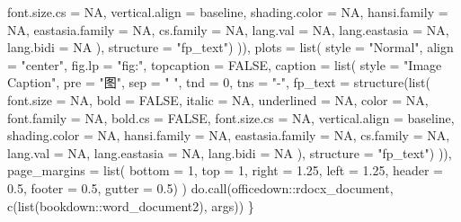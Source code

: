 \documentclass[
]{article}
\newenvironment{Shaded}{\begin{snugshade}}{\end{snugshade}}
\newcommand{\AttributeTok}[1]{\textcolor[rgb]{0.77,0.63,0.00}{#1}}
\newcommand{\ConstantTok}[1]{\textcolor[rgb]{0.00,0.00,0.00}{#1}}
\newcommand{\DecValTok}[1]{\textcolor[rgb]{0.00,0.00,0.81}{#1}}
\newcommand{\FloatTok}[1]{\textcolor[rgb]{0.00,0.00,0.81}{#1}}
\newcommand{\FunctionTok}[1]{\textcolor[rgb]{0.00,0.00,0.00}{#1}}
\newcommand{\NormalTok}[1]{#1}
\newcommand{\SpecialCharTok}[1]{\textcolor[rgb]{0.00,0.00,0.00}{#1}}
\newcommand{\StringTok}[1]{\textcolor[rgb]{0.31,0.60,0.02}{#1}}
\begin{document}
\begin{Shaded}
\begin{Highlighting}[]
          \AttributeTok{font.size.cs =} \ConstantTok{NA}\NormalTok{, }\AttributeTok{vertical.align =} \StringTok{\textquotesingle{}baseline\textquotesingle{}}\NormalTok{, }\AttributeTok{shading.color =} \ConstantTok{NA}\NormalTok{,}
          \AttributeTok{hansi.family =} \ConstantTok{NA}\NormalTok{, }\AttributeTok{eastasia.family =} \ConstantTok{NA}\NormalTok{, }\AttributeTok{cs.family =} \ConstantTok{NA}\NormalTok{,}
          \AttributeTok{lang.val =} \ConstantTok{NA}\NormalTok{, }\AttributeTok{lang.eastasia =} \ConstantTok{NA}\NormalTok{, }\AttributeTok{lang.bidi =} \ConstantTok{NA}
\NormalTok{        ), }\AttributeTok{structure =} \StringTok{"fp\_text"}\NormalTok{)}
\NormalTok{      )),}
    \AttributeTok{plots =} \FunctionTok{list}\NormalTok{(}
      \AttributeTok{style =} \StringTok{"Normal"}\NormalTok{, }\AttributeTok{align =} \StringTok{"center"}\NormalTok{, }\AttributeTok{fig.lp =} \StringTok{"fig:"}\NormalTok{, }\AttributeTok{topcaption =} \ConstantTok{FALSE}\NormalTok{,}
      \AttributeTok{caption =} \FunctionTok{list}\NormalTok{(}
        \AttributeTok{style =} \StringTok{"Image Caption"}\NormalTok{, }\AttributeTok{pre =} \StringTok{"图"}\NormalTok{, }\AttributeTok{sep =} \StringTok{" "}\NormalTok{, }\AttributeTok{tnd =} \DecValTok{0}\NormalTok{, }\AttributeTok{tns =} \StringTok{"{-}"}\NormalTok{,}
        \AttributeTok{fp\_text =} \FunctionTok{structure}\NormalTok{(}\FunctionTok{list}\NormalTok{(}
          \AttributeTok{font.size =} \ConstantTok{NA}\NormalTok{, }\AttributeTok{bold =} \ConstantTok{FALSE}\NormalTok{, }\AttributeTok{italic =} \ConstantTok{NA}\NormalTok{,}
          \AttributeTok{underlined =} \ConstantTok{NA}\NormalTok{, }\AttributeTok{color =} \ConstantTok{NA}\NormalTok{, }\AttributeTok{font.family =} \ConstantTok{NA}\NormalTok{, }\AttributeTok{bold.cs =} \ConstantTok{FALSE}\NormalTok{,}
          \AttributeTok{font.size.cs =} \ConstantTok{NA}\NormalTok{, }\AttributeTok{vertical.align =} \StringTok{\textquotesingle{}baseline\textquotesingle{}}\NormalTok{, }\AttributeTok{shading.color =} \ConstantTok{NA}\NormalTok{,}
          \AttributeTok{hansi.family =} \ConstantTok{NA}\NormalTok{, }\AttributeTok{eastasia.family =} \ConstantTok{NA}\NormalTok{, }\AttributeTok{cs.family =} \ConstantTok{NA}\NormalTok{,}
          \AttributeTok{lang.val =} \ConstantTok{NA}\NormalTok{, }\AttributeTok{lang.eastasia =} \ConstantTok{NA}\NormalTok{, }\AttributeTok{lang.bidi =} \ConstantTok{NA}
\NormalTok{        ), }\AttributeTok{structure =} \StringTok{"fp\_text"}\NormalTok{)}
\NormalTok{        )),}
    \AttributeTok{page\_margins =} \FunctionTok{list}\NormalTok{(}
      \AttributeTok{bottom =} \DecValTok{1}\NormalTok{, }\AttributeTok{top =} \DecValTok{1}\NormalTok{, }\AttributeTok{right =} \FloatTok{1.25}\NormalTok{, }\AttributeTok{left =} \FloatTok{1.25}\NormalTok{, }\AttributeTok{header =} \FloatTok{0.5}\NormalTok{,}
      \AttributeTok{footer =} \FloatTok{0.5}\NormalTok{, }\AttributeTok{gutter =} \FloatTok{0.5}\NormalTok{)}
\NormalTok{  )}
  \FunctionTok{do.call}\NormalTok{(officedown}\SpecialCharTok{::}\NormalTok{rdocx\_document, }\FunctionTok{c}\NormalTok{(}\FunctionTok{list}\NormalTok{(}\StringTok{\textquotesingle{}bookdown::word\_document2\textquotesingle{}}\NormalTok{), args))}
\NormalTok{\}}


\end{Highlighting}
\end{Shaded}
\end{document}
